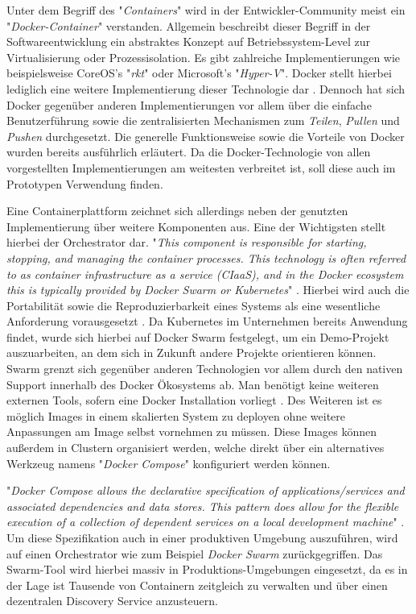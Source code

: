 Unter dem Begriff des "\emph{Containers}" wird in der Entwickler-Community meist ein "\emph{Docker-Container}" verstanden. Allgemein beschreibt dieser Begriff in der Softwareentwicklung ein abstraktes Konzept auf Betriebssystem-Level zur Virtualisierung oder Prozessisolation. Es gibt zahlreiche Implementierungen wie beispielsweise CoreOS's "\emph{rkt}" oder Microsoft's "\emph{Hyper-V}". Docker stellt hierbei lediglich eine weitere Implementierung dieser Technologie dar \cite[Seite~63 ff.]{continuous-delivery}. Dennoch hat sich Docker gegenüber anderen Implementierungen vor allem über die einfache Benutzerführung sowie die zentralisierten Mechanismen zum \emph{Teilen}, \emph{Pullen} und \emph{Pushen} durchgesetzt. Die generelle Funktionsweise sowie die Vorteile von Docker wurden bereits ausführlich erläutert. Da die Docker-Technologie von allen vorgestellten Implementierungen am weitesten verbreitet ist, soll diese auch im Prototypen Verwendung finden. 

Eine Containerplattform zeichnet sich allerdings neben der genutzten Implementierung über weitere Komponenten aus. Eine der Wichtigsten stellt hierbei der Orchestrator dar. "\emph{This component is responsible for starting, stopping, and managing the container processes. This technology is often referred to as container infrastructure as a service (CIaaS), and in the Docker ecosystem this is typically provided by Docker Swarm or Kubernetes}" \cite[Seite~64 ff.]{continuous-delivery}. Hierbei wird auch die Portabilität sowie die Reproduzierbarkeit eines Systems als eine wesentliche Anforderung vorausgesetzt \cite[Kapitel Orchestration]{docker-doc}. Da Kubernetes im Unternehmen bereits Anwendung findet, wurde sich hierbei auf Docker Swarm festgelegt, um ein Demo-Projekt auszuarbeiten, an dem sich in Zukunft andere Projekte orientieren können. Swarm grenzt sich gegenüber anderen Technologien vor allem durch den nativen Support innerhalb des Docker Ökosystems ab. Man benötigt keine weiteren externen Tools, sofern eine Docker Installation vorliegt \cite[Seite~10 ff.]{soppelsaswarm}. Des Weiteren ist es möglich Images in einem skalierten System zu deployen ohne weitere Anpassungen am Image selbst vornehmen zu müssen. Diese Images können außerdem in Clustern organisiert werden, welche direkt über ein alternatives Werkzeug namens "\emph{Docker Compose}" konfiguriert werden können.

"\emph{Docker Compose allows the declarative specification of applications/services and associated dependencies and data stores. This pattern does allow for the flexible execution of a collection of dependent services on a local development machine}" \cite[Seite~173]{continuous-delivery}. Um diese Spezifikation auch in einer produktiven Umgebung auszuführen, wird auf einen Orchestrator wie zum Beispiel \emph{Docker Swarm} zurückgegriffen. Das Swarm-Tool wird hierbei massiv in Produktions-Umgebungen eingesetzt, da es in der Lage ist Tausende von Containern zeitgleich zu verwalten und über einen dezentralen Discovery Service anzusteuern. 

